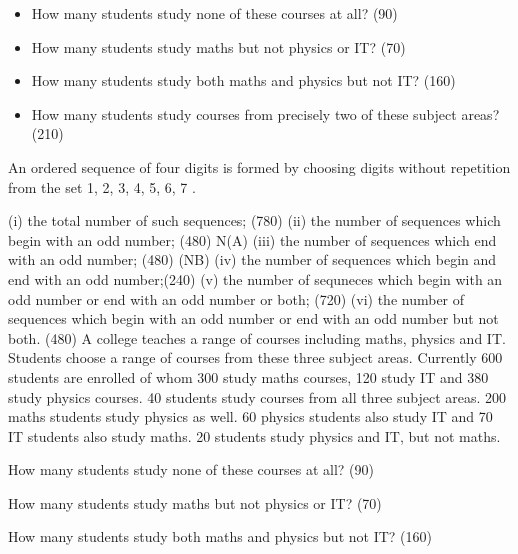 \documentclass[]{report}
\begin{document}
	\begin{itemize}
		\item How many students study none of these courses at all? (90)
		
		\item How many students study maths but not physics or IT? (70)
		
		\item How many students study both maths and physics but not IT? (160)
		
		\item How many students study courses from precisely two of these subject
		areas? (210)
	\end{itemize}
	
	
	
	

	

	

	

	
	

	
	
	
	
	An ordered sequence of four digits is formed by choosing digits without
	repetition from the set {1, 2, 3, 4, 5, 6, 7} .
	
	(i) the total number of such sequences; (780)
	(ii) the number of sequences which begin with an odd number; (480) N(A)
	(iii) the number of sequences which end with an odd number; (480) (NB)
	(iv) the number of sequences which begin and end with an odd number;(240)
	(v) the number of sequneces which begin with an odd number or end with an
	odd number or both; (720)
	(vi) the number of sequences which begin with an odd number or end with an
	odd number but not both. (480)
	A college teaches a range of courses including maths, physics and IT.
	Students choose a range of courses from these three subject areas. Currently 600
	students are enrolled of whom 300 study maths courses, 120 study IT
	and 380 study physics courses. 40 students study courses from all three subject
	areas. 200 maths students study physics as well. 60 physics students
	also study IT and 70 IT students also study maths. 20 students study physics and IT, but not maths.
	
	How many students study none of these courses at all? (90)
	
	How many students study maths but not physics or IT? (70)
	
	How many students study both maths and physics but not IT? (160)
	
\end{document}
